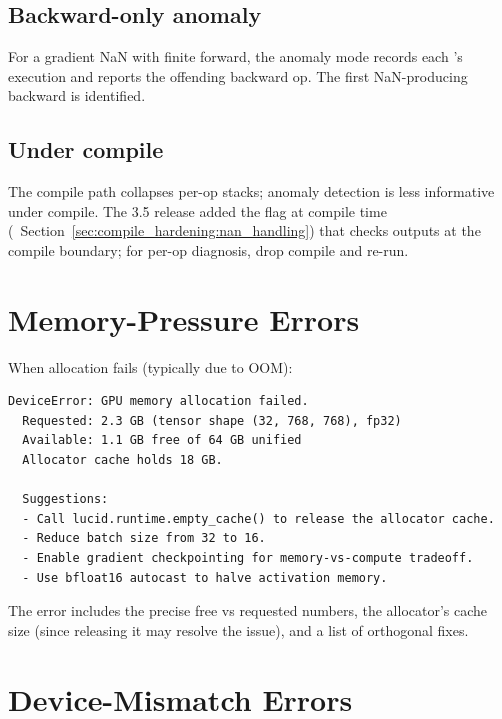 \subsection{Backward-only anomaly}
\label{ssec:error_handling:bwd_anomaly}

For a gradient NaN with finite forward, the anomaly mode
records each 's execution and reports the offending
backward op. The first NaN-producing backward is identified.

\subsection{Under compile}
\label{ssec:error_handling:anomaly_compile}

The compile path collapses per-op stacks; anomaly detection is
less informative under compile. The 3.5 release added the
 flag at compile time
(~Section~\ref{sec:compile_hardening:nan_handling})
that checks outputs at the compile boundary; for per-op
diagnosis, drop compile and re-run.

\section{Memory-Pressure Errors}
\label{sec:error_handling:memory_errors}

When allocation fails (typically due to OOM):

\begin{lstlisting}[style=lucid,language=LucidPython]
DeviceError: GPU memory allocation failed.
  Requested: 2.3 GB (tensor shape (32, 768, 768), fp32)
  Available: 1.1 GB free of 64 GB unified
  Allocator cache holds 18 GB.

  Suggestions:
  - Call lucid.runtime.empty_cache() to release the allocator cache.
  - Reduce batch size from 32 to 16.
  - Enable gradient checkpointing for memory-vs-compute tradeoff.
  - Use bfloat16 autocast to halve activation memory.
\end{lstlisting}

The error includes the precise free vs requested numbers, the
allocator's cache size (since releasing it may resolve the
issue), and a list of orthogonal fixes.

\section{Device-Mismatch Errors}
\label{sec:error_handling:device_mismatch}


